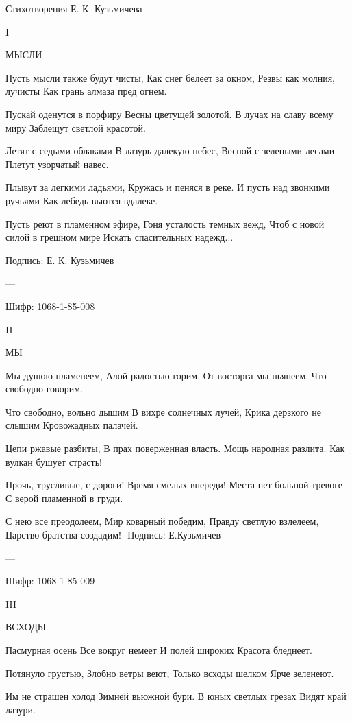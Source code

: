 \documentclass[]{memoir}
\begin{document}
Стихотворения Е. К. Кузьмичева

I

МЫСЛИ

Пусть мысли также будут чисты,
          Как снег белеет за окном, 
Резвы как молния, лучисты
          Как грань алмаза пред огнем.

Пускай оденутся в порфиру
          Весны цветущей золотой.
В лучах на славу всему миру
          Заблещут светлой красотой.

Летят с седыми облаками
          В лазурь далекую небес,
Весной с зелеными лесами
          Плетут узорчатый навес.

Плывут за легкими ладьями,
          Кружась и пеняся в реке.
И пусть над звонкими ручьями
          Как лебедь вьются вдалеке.

Пусть реют в пламенном эфире,
          Гоня усталость темных вежд,
Чтоб с новой силой в грешном мире
          Искать спасительных надежд...

Подпись: Е. К. Кузьмичев
          
---

Шифр: 1068-1-85-008

II

МЫ


Мы душою пламенеем,
Алой радостью горим,
От восторга мы пьянеем,
Что свободно говорим.

    Что свободно, вольно дышим
    В вихре солнечных лучей,
    Крика дерзкого не слышим
    Кровожадных палачей.

Цепи ржавые разбиты,
В прах поверженная власть.
Мощь народная разлита.
Как вулкан бушует страсть!

    Прочь, трусливые, с дороги!
    Время смелых впереди!
    Места нет больной тревоге
    С верой пламенной в груди.

С нею все преодолеем,
Мир коварный победим,
Правду светлую взлелеем,
Царство братства создадим!
﻿                           
Подпись: Е.Кузьмичев

---

Шифр: 1068-1-85-009

III 

ВСХОДЫ


Пасмурная осень
     Все вокруг немеет
И полей широких
     Красота бледнеет. 

Потянуло грустью,
     Злобно ветры веют,
Только всходы шелком
     Ярче зеленеют.

Им не страшен холод
     Зимней вьюжной бури.
В юных светлых грезах
     Видят край лазури.
\end{document}
